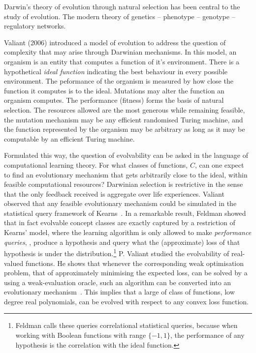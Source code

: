 Darwin's theory of evolution through natural selection has been central to the
study of evolution. The modern theory of genetics  -- phenotype -- genotype --
regulatory networks. 

Valiant (2006) introduced a model of evolution to address the question of
complexity that may arise through Darwinian mechanisms. In this model, an
organism is an entity that computes a function of it's environment. There is a
hypothetical \emph{ideal function} indicating the best behaviour in every
possible environment. The peformance of the organism is measured by how close
the function it computes is to the ideal. Mutations may alter the function an
organism computes. The performance (fitness) forms the basis of natural
selection. The resources allowed are the most generous while remaining feasible,
the mutation mechanism may be any efficient randomised Turing machine, and the
function represented by the organism may be arbitrary as long as it may be
computable by an efficient Turing machine.

Formulated this way, the question of evolvability can be asked in the language
of computational learning theory. For what classes of functions, $C$, can one
expect to find an evolutionary mechanism that gets arbitrarily close to the
ideal, within feasible computational resources? Darwinian selection is
restrictive in the sense that the only feedback received is aggregate over life
experiences. Valiant observed that any feasible evolutionary mechanism could be
simulated in the statistical query framework of Kearns~\cite{Kearns:1994}. In a
remarkable result, Feldman showed that in fact evolvable concept classes are
exactly captured by a restriction of Kearns' model, where the learning algorithm
is only allowed to make \emph{performance queries}, \ie, produce a hypothesis
and query what the (approximate) loss of that hypothesis is under the
distribution.\footnote{Feldman calls these queries correlational statistical
queries, because when working with Boolean functions with range $\{-1, 1\}$, the
performance of any hypothesis is the correlation with the ideal function.} P.
Valiant studied the evolvability of real-valued functions. He shows that
whenever the corresponding weak optimisation problem, that of approximately
minimising the expected loss, can be solved by a using a weak-evaluation oracle,
such an algorithm can be converted into an evolutionary
mechanism~\cite{Valiant:2012-real}. This implies that a large of class of
functions, low degree real polynomials, can be evolved with respect to any
convex loss function.

